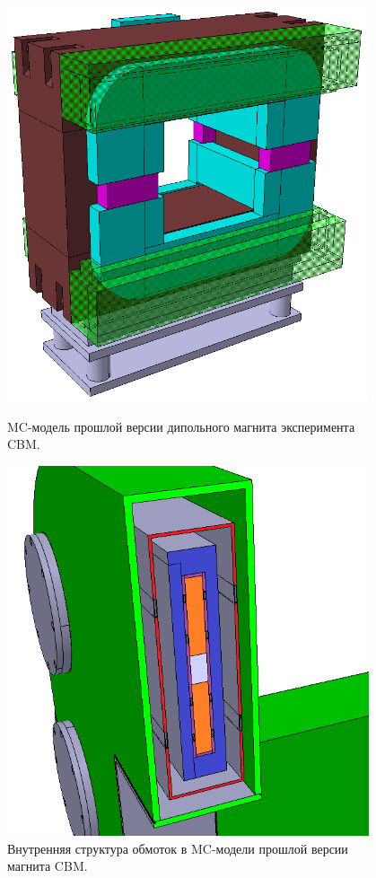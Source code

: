 \begin{figure}[H]
\begin{minipage}[b]{0.495\textwidth}
\includegraphics[width=0.95\textwidth]{pictures/Old_magnet_2.png}
\caption{MC-модель прошлой версии дипольного магнита эксперимента CBM.}
\label{fig:OldCbmMagnet1}
\end{minipage}
\hspace{0.01\textwidth}
\begin{minipage}[b]{0.495\textwidth}
\includegraphics[width=0.95\textwidth]{pictures/Old_magnet_coils.png}
\caption{Внутренняя структура обмоток в MC-модели прошлой версии магнита CBM.}
\label{fig:OldCbmMagnet2}
\end{minipage}
\end{figure}

